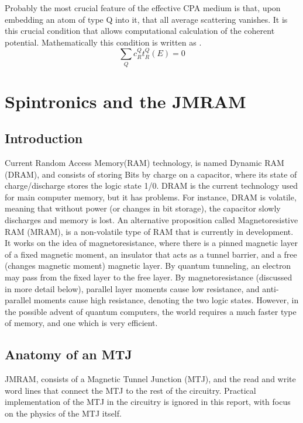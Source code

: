 \documentclass[12pt]{article}
\begin{document}
Probably the most crucial feature of the effective CPA medium is that, upon embedding an atom of type Q into it, that all average scattering vanishes. It is this crucial condition that allows computational calculation of the coherent potential. Mathematically this condition is written as \cite{turek}.
\begin{equation} \label{4.1} \tag{5.4}
\sum_Qc_R^Qt_R^Q(E)=0
\end{equation}

\section{Spintronics and the JMRAM}
\subsection{Introduction}

Current Random Access Memory(RAM) technology, is named Dynamic RAM (DRAM), and consists of storing Bits by charge on a capacitor, where its state of charge/discharge stores the logic state 1/0. DRAM is the current technology used for main computer memory, but it has problems. For instance, DRAM is volatile, meaning that without power (or changes in bit storage), the capacitor slowly discharges and memory is lost. An alternative proposition called Magnetoresistive RAM (MRAM), is a non-volatile type of RAM that is currently in development\cite{mram}. It works on the idea of magnetoresistance, where there is a pinned magnetic layer of a fixed magnetic moment, an insulator that acts as a tunnel barrier, and a free (changes magnetic moment) magnetic layer. By quantum tunneling, an electron may pass from the fixed layer to the free layer. By magnetoresistance (discussed in more detail below), parallel layer moments cause low resistance, and anti-parallel moments cause high resistance, denoting the two logic states. However, in the possible advent of quantum computers, the world requires a much faster type of memory, and one which is very efficient.
\clearpage
\subsection{Anatomy of an MTJ}

JMRAM, consists of a Magnetic Tunnel Junction (MTJ), and the read and write word lines that connect the MTJ to the rest of the circuitry. Practical implementation of the MTJ in the circuitry is ignored in this report, with focus on the physics of the MTJ itself.
 
\end{document}
